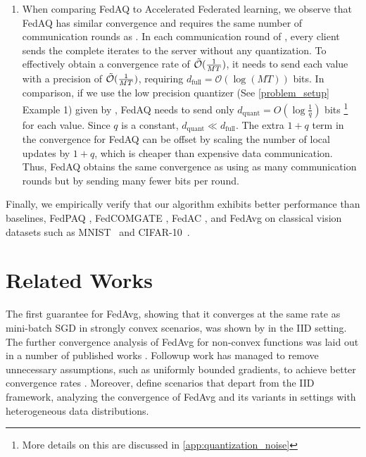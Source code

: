 \documentclass[11pt]{article}
\begin{document}
\begin{enumerate}
    \item \label{contribution2} When comparing FedAQ to Accelerated Federated learning, we observe that FedAQ has similar convergence and requires the same number of communication rounds as \cite{Yeojoon-yuan2020federated}. In each communication round of \cite{Yeojoon-yuan2020federated}, every client sends the complete iterates to the server without any quantization. To effectively obtain a convergence rate of $\Tilde{\mathcal{O}}(\frac{1}{MT})$, it needs to send each value with a precision of $\Tilde{\mathcal{O}}(\frac{1}{MT})$, requiring $d_{\text{full}} = {\mathcal{O}}(\log{(MT)})$ bits. In comparison, if we use the low precision quantizer (See \cref{problem_setup} Example 1) given by \cite{Yeojoon-alistarh2017qsgd}, FedAQ needs to send only $d_{\text{quant}} = O(\log \frac{1}{q})$ bits \footnote{More details on this are discussed in \cref{app:quantization_noise}} for each value. Since $q$ is a constant, $d_{\text{quant}} \ll d_{\text{full}}$. The extra $1+q$ term in the convergence for FedAQ can be offset by scaling the number of local updates by $1+q$, which is cheaper than expensive data communication. Thus, FedAQ obtains the same convergence as \cite{Yeojoon-yuan2020federated} using as many communication rounds but by sending many fewer bits per round.


 \end{enumerate}

 Finally, we empirically verify that our algorithm exhibits better performance than baselines, FedPAQ \cite{Yeojoon-reisizadeh2020fedpaq}, FedCOMGATE \cite{Yeojoon-haddadpour2021federated}, FedAC \cite{Yeojoon-yuan2020federated}, and FedAvg \cite{Yeojoon-mcmahan2017communication} on classical vision datasets such as MNIST~\cite{Yeojoon-lecun1998mnist} and CIFAR-10~\cite{Yeojoon-krizhevsky2009learning}.


\section{Related Works}

The first guarantee for FedAvg, showing that it converges at the same rate as mini-batch SGD in strongly convex scenarios, was shown by \cite{Yeojoon-stich2018local} in the IID setting. The further convergence analysis of FedAvg for non-convex functions was laid out in a number of published works \cite{Yeojoon-wang2018cooperative, Yeojoon-haddadpour2019trading, Yeojoon-yu2019parallel}. Followup work has managed to remove unnecessary assumptions, such as uniformly bounded gradients, to achieve better convergence rates \cite{Yeojoon-wang2018cooperative, Yeojoon-stich2019error, Yeojoon-haddadpour2019local, Yeojoon-khaled2020tighter, Yeojoon-woodworth2020local}. Moreover, \cite{Yeojoon-li2018federated, Yeojoon-haddadpour2019convergence, Yeojoon-li2019convergence, Yeojoon-khaled2020tighter, Yeojoon-karimireddy2020scaffold} define scenarios that depart from the IID framework, analyzing the convergence of FedAvg and its variants in settings with heterogeneous data distributions.
\end{document}
